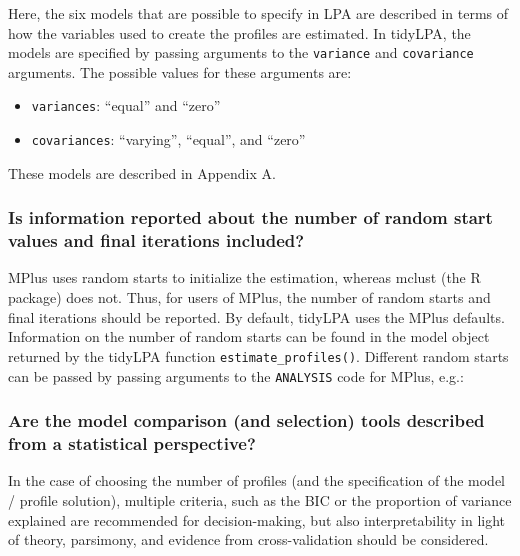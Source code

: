 \documentclass[man]{apa6}
\providecommand{\tightlist}{%
  \setlength{\itemsep}{0pt}\setlength{\parskip}{0pt}}
\begin{document}
Here, the six models that are possible to specify in LPA are described in terms of how the variables used to create the profiles are estimated. In tidyLPA, the models are specified by passing
arguments to the \texttt{variance} and \texttt{covariance} arguments. The possible values for
these arguments are:

\begin{itemize}
\tightlist
\item
  \texttt{variances}: \enquote{equal} and \enquote{zero}
\item
  \texttt{covariances}: \enquote{varying}, \enquote{equal}, and \enquote{zero}
\end{itemize}

These models are described in Appendix A.

\hypertarget{is-information-reported-about-the-number-of-random-start-values-and-final-iterations-included}{%
\subsubsection{Is information reported about the number of random start values and final iterations included?}\label{is-information-reported-about-the-number-of-random-start-values-and-final-iterations-included}}

MPlus uses random starts to initialize the estimation, whereas mclust (the R package) does not. Thus, for users of MPlus, the number of random starts and final iterations should be reported. By default, tidyLPA uses the MPlus defaults. Information on the number of random starts can be found in the model object returned by the tidyLPA function \texttt{estimate\_profiles()}. Different random starts can be passed by passing arguments to the \texttt{ANALYSIS} code for MPlus, e.g.:

\hypertarget{are-the-model-comparison-and-selection-tools-described-from-a-statistical-perspective}{%
\subsubsection{Are the model comparison (and selection) tools described from a statistical perspective?}\label{are-the-model-comparison-and-selection-tools-described-from-a-statistical-perspective}}

In the case of choosing the number of profiles (and the specification of the
model / profile solution), multiple criteria, such as the BIC or the proportion
of variance explained are recommended for decision-making, but also
interpretability in light of theory, parsimony, and evidence from
cross-validation should be considered.
\end{document}

